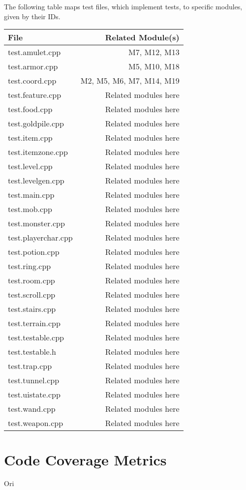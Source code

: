\documentclass[12pt, titlepage]{article}
\begin{document}
	The following table maps test files, which implement tests, to specific modules, given by their IDs.\\

	\begin{table}[h]
		\caption{\bf Test-Module Trace}
		\label{TblMH}
		\bigskip
		\centering
		\def\arraystretch{1.2}
			\begin{longtable}{lr}
				\hline
				File & Related Module(s)\\
				\hline
				test.amulet.cpp 		& M7, M12, M13\\
				test.armor.cpp 			& M5, M10, M18\\
				test.coord.cpp 			& M2, M5, M6, M7, M14, M19\\
				test.feature.cpp 		& Related modules here\\
				test.food.cpp 			& Related modules here\\
				test.goldpile.cpp 		& Related modules here\\
				test.item.cpp 			& Related modules here\\
				test.itemzone.cpp 		& Related modules here\\
				test.level.cpp 			& Related modules here\\
				test.levelgen.cpp 		& Related modules here\\
				test.main.cpp 			& Related modules here\\
				test.mob.cpp 			& Related modules here\\
				test.monster.cpp 		& Related modules here\\
				test.playerchar.cpp 	& Related modules here\\
				test.potion.cpp 		& Related modules here\\
				test.ring.cpp 			& Related modules here\\
				test.room.cpp 			& Related modules here\\
				test.scroll.cpp 		& Related modules here\\
				test.stairs.cpp 		& Related modules here\\
				test.terrain.cpp 		& Related modules here\\
				test.testable.cpp 		& Related modules here\\
				test.testable.h 		& Related modules here\\
				test.trap.cpp 			& Related modules here\\
				test.tunnel.cpp 		& Related modules here\\
				test.uistate.cpp 		& Related modules here\\
				test.wand.cpp 			& Related modules here\\
				test.weapon.cpp 		& Related modules here\\
				\hline
			\end{longtable}
	\end{table}



\section{Code Coverage Metrics}
	Ori




\end{document}
